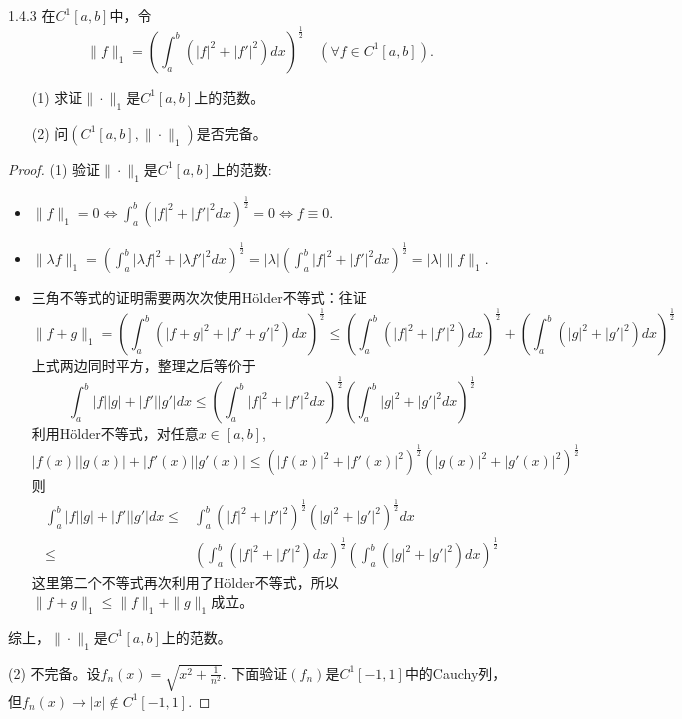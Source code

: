 \documentclass[a4paper,8pt]{ctexart}\textwidth 140mm \textheight 216mm
\newcommand{\8}{\infty}
\begin{document}
1.4.3 在$C^1[a,b]$中，令
$$\|f\|_1=(\int_a^b (|f|^2+|f'|^2)dx)^{\frac{1}{2}}\quad(\forall f\in C^1[a,b]).$$
\begin{enumerate}
	\item[(1)] 求证$\|\cdot\|_1$是$C^1[a,b]$上的范数。
	\item[(2)] 问$(C^1[a,b],\|\cdot\|_1)$是否完备。
\end{enumerate}
\begin{proof}
	(1) 验证$\|\cdot\|_1$是$C^1[a,b]$上的范数:
	\begin{itemize}
		\item $\|f\|_1=0\Leftrightarrow\int_a^b (|f|^2+|f'|^2dx)^{\frac{1}{2}}=0\Leftrightarrow f\equiv0.$
		\item $\|\lambda f\|_1=(\int_a^b|\lambda f|^2+|\lambda f'|^2dx)^{\frac{1}{2}}=|\lambda|(\int_a^b|f|^2+|f'|^2dx)^{\frac{1}{2}}=|\lambda|\|f\|_1$.
		\item 三角不等式的证明需要两次次使用H\"older不等式：往证
		\begin{equation*}
			\|f+g\|_1=(\int_a^b(|f+g|^2+|f'+g'|^2)dx)^{\frac{1}{2}}\leq (\int_a^b (|f|^2+|f'|^2)dx)^{\frac{1}{2}}+(\int_a^b (|g|^2+|g'|^2)dx)^{\frac{1}{2}}
		\end{equation*}
		上式两边同时平方，整理之后等价于
		\begin{equation*}
			\int_a^b |f||g|+|f'||g'|dx\leq (\int_a^b |f|^2+|f'|^2dx)^{\frac{1}{2}}(\int_a^b |g|^2+|g'|^2dx)^{\frac{1}{2}}
		\end{equation*}
		利用H\"older不等式，对任意$x\in[a,b]$, 
		$$|f(x)||g(x)|+|f'(x)||g'(x)|\leq (|f(x)|^2+|f'(x)|^2)^{\frac{1}{2}}(|g(x)|^2+|g'(x)|^2)^{\frac{1}{2}}$$ 则
	\begin{equation*}
	\begin{split}
	\int_a^b |f||g|+|f'||g'|dx\leq & \int_a^b (|f|^2+|f'|^2)^{\frac{1}{2}}(|g|^2+|g'|^2)^{\frac{1}{2}}dx\\
	\leq & (\int_a^b (|f|^2+|f'|^2)dx)^{\frac{1}{2}}(\int_a^b (|g|^2+|g'|^2)dx)^{\frac{1}{2}}
	\end{split}
	\end{equation*}
	这里第二个不等式再次利用了H\"older不等式，所以$\|f+g\|_1\leq \|f\|_1+\|g\|_1$成立。
	\end{itemize}
    综上，$\|\cdot\|_1$是$C^1[a,b]$上的范数。
    
    (2) 不完备。设$f_n(x)=\sqrt{x^2+\frac{1}{n^2}}$. 下面验证$(f_n)$是$C^1[-1,1]$中的Cauchy列，但$f_n(x)\rightarrow |x|\notin C^1[-1,1]$. 
    

\end{proof}
\end{document}
